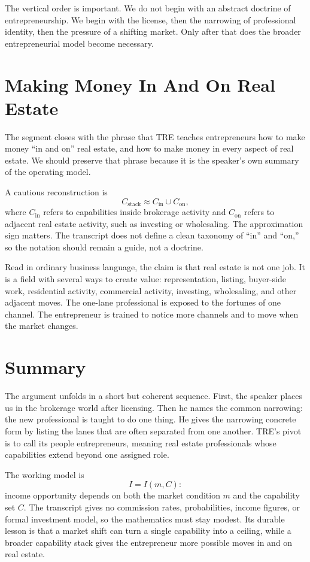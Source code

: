 The vertical order is important. We do not begin with an abstract doctrine of entrepreneurship. We begin with the license, then the narrowing of professional identity, then the pressure of a shifting market. Only after that does the broader entrepreneurial model become necessary.

\section{Making Money In And On Real Estate}

The segment closes with the phrase that TRE teaches entrepreneurs how to make money ``in and on'' real estate, and how to make money in every aspect of real estate. We should preserve that phrase because it is the speaker's own summary of the operating model.

A cautious reconstruction is
\begin{equation}
C_{\text{stack}}
\approx
C_{\mathrm{in}}\cup C_{\mathrm{on}},
\end{equation}
where \(C_{\mathrm{in}}\) refers to capabilities inside brokerage activity and \(C_{\mathrm{on}}\) refers to adjacent real estate activity, such as investing or wholesaling. The approximation sign matters. The transcript does not define a clean taxonomy of ``in'' and ``on,'' so the notation should remain a guide, not a doctrine.

Read in ordinary business language, the claim is that real estate is not one job. It is a field with several ways to create value: representation, listing, buyer-side work, residential activity, commercial activity, investing, wholesaling, and other adjacent moves. The one-lane professional is exposed to the fortunes of one channel. The entrepreneur is trained to notice more channels and to move when the market changes.

\section{Summary}

The argument unfolds in a short but coherent sequence. First, the speaker places us in the brokerage world after licensing. Then he names the common narrowing: the new professional is taught to do one thing. He gives the narrowing concrete form by listing the lanes that are often separated from one another. TRE's pivot is to call its people entrepreneurs, meaning real estate professionals whose capabilities extend beyond one assigned role.

The working model is
\begin{equation}
I=I(m,C):
\end{equation}
income opportunity depends on both the market condition \(m\) and the capability set \(C\). The transcript gives no commission rates, probabilities, income figures, or formal investment model, so the mathematics must stay modest. Its durable lesson is that a market shift can turn a single capability into a ceiling, while a broader capability stack gives the entrepreneur more possible moves in and on real estate.